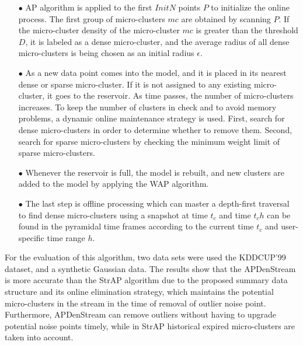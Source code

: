 \begin{itemize}
    \item[$\bullet$] AP algorithm is applied to the first $InitN$ points $P$ to initialize the online process. The first group of micro-clusters $mc$ are obtained by scanning $P$. If the micro-cluster density of the micro-cluster $mc$ is greater than the threshold $D$, it is labeled as a dense micro-cluster, and the average radius of all dense micro-clusters is being chosen as an initial radius $\epsilon$.
    
    \item[$\bullet$] As a new data point comes into the model, and it is placed in its nearest dense or sparse micro-cluster. If it is not assigned to any existing micro-cluster, it goes to the reservoir. As time passes, the number of micro-clusters increases. To keep the number of clusters in check and to avoid memory problems, a dynamic online maintenance strategy is used.  First, search for dense micro-clusters in order to determine whether to remove them. Second, search for sparse micro-clusters by checking the minimum weight limit of sparse micro-clusters. 

    \item[$\bullet$] Whenever the reservoir is full, the model is rebuilt, and new clusters are added to the model by applying the WAP algorithm.     
    
   \item[$\bullet$] The last step is offline processing which can master a depth-first traversal to find dense micro-clusters using a snapshot at time $t_c$ and time $t_ch$ can be found in the pyramidal time frames according to the current time $t_c$ and user-specific time range $h$. 
\end{itemize}


For the evaluation of this algorithm, two data sets were used the KDDCUP'99 dataset, and a synthetic Gaussian data. The results show that the APDenStream is more accurate than the StrAP algorithm due to the proposed summary data structure and its online elimination strategy, which maintains the potential micro-clusters in the stream in the time of removal of outlier noise point. Furthermore, APDenStream can remove outliers without having to upgrade potential noise points timely, while in StrAP historical expired micro-clusters are taken into account.



